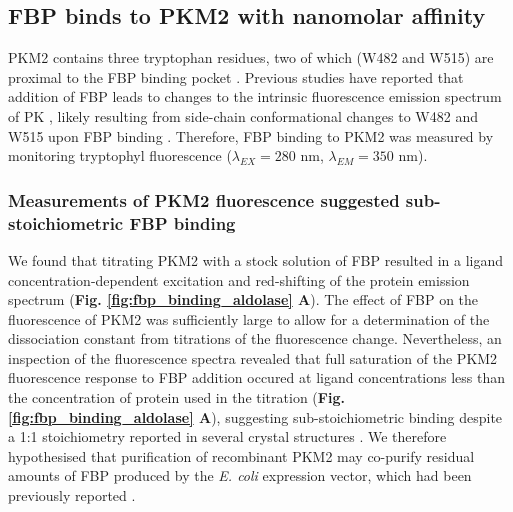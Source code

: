 \subsection{FBP binds to PKM2 with nanomolar affinity}
\label{subsec:fbp_binding_pkm2}
PKM2 contains three tryptophan residues, two of which (W482 and W515) are proximal to the FBP binding pocket \cite{Dombrauckas:2005aa}. Previous studies have reported that addition of FBP leads to changes to the intrinsic fluorescence emission spectrum of PK \cite{Kuczenski:1971aa}, likely resulting from side-chain conformational changes to W482 and W515 upon FBP binding \cite{Morgan:2013aa}. Therefore, FBP binding to PKM2 was measured by monitoring tryptophyl fluorescence ($\lambda_{EX} = 280$ nm,  $\lambda_{EM} = 350$ nm). 

\subsubsection{Measurements of PKM2 fluorescence suggested sub-stoichiometric FBP binding}
We found that titrating PKM2 with a stock solution of FBP resulted in a ligand concentration-dependent excitation and red-shifting of the protein emission spectrum (\textbf{Fig. \ref{fig:fbp_binding_aldolase} A}). The effect of FBP on the fluorescence of PKM2 was sufficiently large to allow for a determination of the dissociation constant from titrations of the fluorescence change. Nevertheless, an inspection of the fluorescence spectra revealed that full saturation of the PKM2 fluorescence response to FBP addition occured at ligand concentrations less than the concentration of protein used in the titration (\textbf{Fig. \ref{fig:fbp_binding_aldolase} A}), suggesting sub-stoichiometric binding despite a 1:1 stoichiometry reported in several crystal structures \cite{Dombrauckas:2005aa,Chaneton:2012aa,Anastasiou:2012aa}. We therefore hypothesised that purification of recombinant PKM2 may co-purify residual amounts of FBP produced by the \textit{E. coli} expression vector, which had been previously reported \cite{Christofk:2008aa,Gavriilidou:2018aa,Morgan:2013aa}. 

